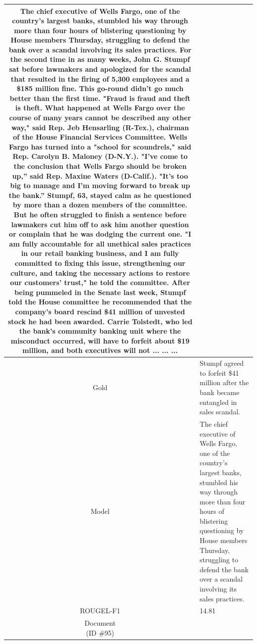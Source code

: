 \begin{table}[bth!]
\begin{tabular}{c|p{}}
The chief executive of Wells Fargo, one of the country’s largest banks, stumbled his way through more than four hours of blistering questioning by House members Thursday, struggling to defend the bank over a scandal involving its sales practices. For the second time in as many weeks, John G. Stumpf sat before lawmakers and apologized for the scandal that resulted in the firing of 5,300 employees and a \$185 million fine. This go-round didn’t go much better than the first time. "Fraud is fraud and theft is theft. What happened at Wells Fargo over the course of many years cannot be described any other way," said Rep. Jeb Hensarling (R-Tex.), chairman of the House Financial Services Committee. Wells Fargo has turned into a "school for scoundrels," said Rep. Carolyn B. Maloney (D-N.Y.). "I’ve come to the conclusion that Wells Fargo should be broken up,” said Rep. Maxine Waters (D-Calif.). "It’s too big to manage and I’m moving forward to break up the bank.” Stumpf, 63, stayed calm as he questioned by more than a dozen members of the committee. But he often struggled to finish a sentence before lawmakers cut him off to ask him another question or complain that he was dodging the current one. "I am fully accountable for all unethical sales practices in our retail banking business, and I am fully committed to fixing this issue, strengthening our culture, and taking the necessary actions to restore our customers’ trust," he told the committee. After being pummeled in the Senate last week, Stumpf told the House committee he recommended that the company’s board rescind \$41 million of unvested stock he had been awarded. Carrie Tolstedt, who led the bank's community banking unit where the misconduct occurred, will have to forfeit about \$19 million, and both executives will not ... ... ... 
\\ \hline
Gold & 
Stumpf agreed to forfeit \$41 million after the bank became entangled in sales scandal.
\\ \hline
Model & 
The chief executive of Wells Fargo, one of the country’s largest banks, stumbled his way through more than four hours of blistering questioning by House members Thursday, struggling to defend the bank over a scandal involving its sales practices.
\\ \hline
ROUGEL-F1 & 
14.81
\\ \hline
\makecell{Document\\(ID \#95)} & 

\end{tabular}
\end{table}
